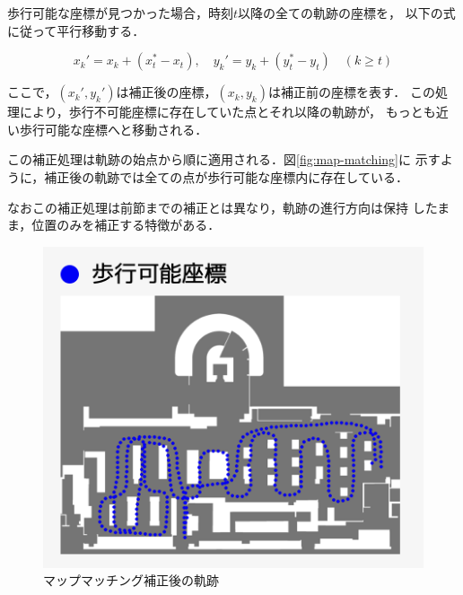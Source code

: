 歩行可能な座標が見つかった場合，時刻$t$以降の全ての軌跡の座標を，
以下の式に従って平行移動する．

\begin{equation}
x_k' = x_k + (x_t^* - x_t), \quad y_k' = y_k + (y_t^* - y_t) \quad (k \geq t)
\end{equation}

ここで，$(x_k', y_k')$は補正後の座標，$(x_k, y_k)$は補正前の座標を表す．
この処理により，歩行不可能座標に存在していた点とそれ以降の軌跡が，
もっとも近い歩行可能な座標へと移動される．

この補正処理は軌跡の始点から順に適用される．図\ref{fig:map-matching}に
示すように，補正後の軌跡では全ての点が歩行可能な座標内に存在している．

なおこの補正処理は前節までの補正とは異なり，軌跡の進行方向は保持
したまま，位置のみを補正する特徴がある．
\begin{figure}[H]
    \centering
    \includegraphics[width=\linewidth]{../image/walkable-points.jpg}
    \caption{マップマッチング補正後の軌跡}    \label{fig:walkable-points}
\end{figure}
